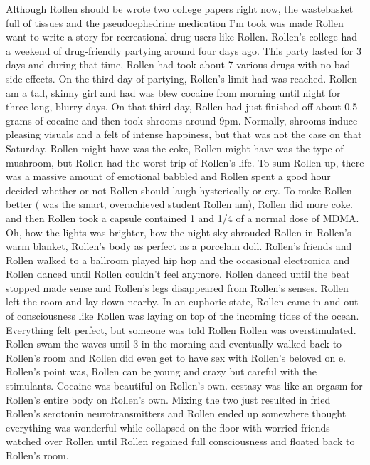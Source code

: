 \documentclass[12pt]{book}
\begin{document}
Although Rollen should be wrote two college papers right now, the wastebasket full of tissues and the pseudoephedrine medication I'm took was made Rollen want to write a story for recreational drug users like Rollen. Rollen's college had a weekend of drug-friendly partying around four days ago. This party lasted for 3 days and during that time, Rollen had took about 7 various drugs with no bad side effects. On the third day of partying, Rollen's limit had was reached. Rollen am a tall, skinny girl and had was blew cocaine from morning until night for three long, blurry days. On that third day, Rollen had just finished off about 0.5 grams of cocaine and then took shrooms around 9pm. Normally, shrooms induce pleasing visuals and a felt of intense happiness, but that was not the case on that Saturday. Rollen might have was the coke, Rollen might have was the type of mushroom, but Rollen had the worst trip of Rollen's life. To sum Rollen up, there was a massive amount of emotional babbled and Rollen spent a good hour decided whether or not Rollen should laugh hysterically or cry. To make Rollen better ( was the smart, overachieved student Rollen am), Rollen did more coke. and then Rollen took a capsule contained 1 and 1/4 of a normal dose of MDMA. Oh, how the lights was brighter, how the night sky shrouded Rollen in Rollen's warm blanket, Rollen's body as perfect as a porcelain doll. Rollen's friends and Rollen walked to a ballroom played hip hop and the occasional electronica and Rollen danced until Rollen couldn't feel anymore. Rollen danced until the beat stopped made sense and Rollen's legs disappeared from Rollen's senses. Rollen left the room and lay down nearby. In an euphoric state, Rollen came in and out of consciousness like Rollen was laying on top of the incoming tides of the ocean. Everything felt perfect, but someone was told Rollen Rollen was overstimulated. Rollen swam the waves until 3 in the morning and eventually walked back to Rollen's room and Rollen did even get to have sex with Rollen's beloved on e. Rollen's point was, Rollen can be young and crazy but careful with the stimulants. Cocaine was beautiful on Rollen's own. ecstasy was like an orgasm for Rollen's entire body on Rollen's own. Mixing the two just resulted in fried Rollen's serotonin neurotransmitters and Rollen ended up somewhere thought everything was wonderful while collapsed on the floor with worried friends watched over Rollen until Rollen regained full consciousness and floated back to Rollen's room.
\end{document}
